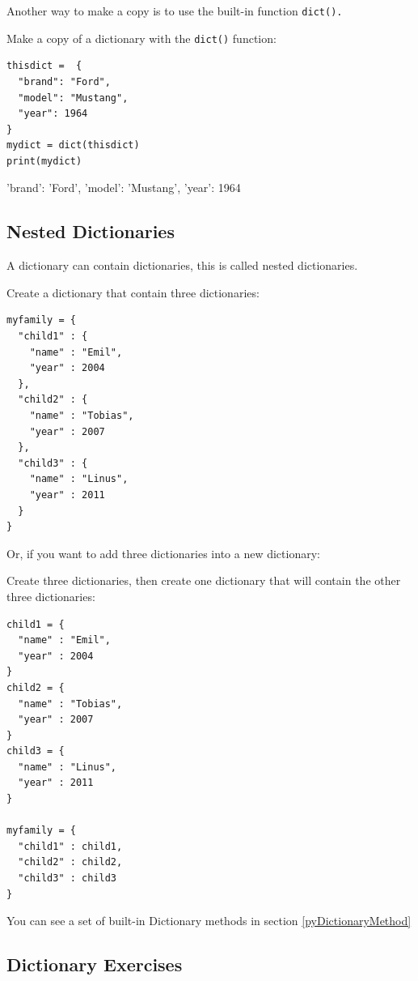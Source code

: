 \documentclass[12pt,a4paper]{article}
\newcommand{\code}[1]{%
	\colorbox{backcolour}{\lstinline{#1}}%
}
\newcommand{\lcode}[1]{%
	\lstinline{#1}%
}
\begin{document}
Another way to make a copy is to use the built-in function \code{dict().}

\begin{ebox}
Make a copy of a dictionary with the \lcode{dict()} function:
	\begin{lstlisting}
thisdict =	{
  "brand": "Ford",
  "model": "Mustang",
  "year": 1964
}
mydict = dict(thisdict)
print(mydict)
	\end{lstlisting}
\tcblower
	\begin{vercode}
{'brand': 'Ford', 'model': 'Mustang', 'year': 1964}
	\end{vercode}
\end{ebox}
\subsection{Nested Dictionaries}

A dictionary can contain dictionaries, this is called nested dictionaries.

\begin{ebox}
Create a dictionary that contain three dictionaries:
	\begin{lstlisting}
myfamily = {
  "child1" : {
    "name" : "Emil",
    "year" : 2004
  },
  "child2" : {
    "name" : "Tobias",
    "year" : 2007
  },
  "child3" : {
    "name" : "Linus",
    "year" : 2011
  }
}
	\end{lstlisting}
\end{ebox}

Or, if you want to add three dictionaries into a new dictionary:

\begin{ebox}
Create three dictionaries, then create one dictionary that will contain the
other three dictionaries:
	\begin{lstlisting}
child1 = {
  "name" : "Emil",
  "year" : 2004
}
child2 = {
  "name" : "Tobias",
  "year" : 2007
}
child3 = {
  "name" : "Linus",
  "year" : 2011
}

myfamily = {
  "child1" : child1,
  "child2" : child2,
  "child3" : child3
}
	\end{lstlisting}
\end{ebox}
You can see a set of built-in Dictionary methods in section \ref{pyDictionaryMethod}
\subsection{Dictionary Exercises}
\end{document}
